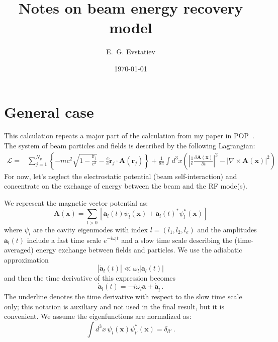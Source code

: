 \documentclass[11pt]{article}
\date{\today} %
\author{E.~G. Evstatiev}
\title{Notes on beam energy recovery model}
\newcommand{\LL}{\mathcal{L}}
\begin{document}
\maketitle

\section{General case}
\label{General_case}

This calculation repeats a major part of the calculation from my paper in POP~\cite{evstatiev_relativistic_2005}. 
The system of beam particles and fields is described by the following Lagrangian:
%
\begin{align}
\LL =& \sum_{j=1}^{N_p}\left\{ -mc^2\sqrt{1-\frac{\dot{\mathbf{r}}_j} {c^2}} 
-\frac{e}{c}\dot{\mathbf{r}}_j \cdot \mathbf{A}(\mathbf{r}_j) \right\}
+\frac{1}{8\pi}\int \!\!d^3 x \left(\left|\frac{1}{c}\frac{\partial \mathbf{A}(\mathbf{x})}{\partial t}\right|^2
 - \left| \nabla\times \mathbf{A}(\mathbf{x}) \right|^2  \right)
\label{L_cont}
\end{align}
%
For now, let's neglect the electrostatic potential (beam self-interaction) and concentrate on the 
exchange of energy between the beam and the RF mode(s).

We represent the magnetic vector potential as:
%
\begin{equation}
\mathbf{A}(\mathbf{x}) = \sum_{l>0}\left[ \mathbf{a}_l(t)\psi_l(\mathbf{x}) + \mathbf{a}_l(t)^*\psi_l^*(\mathbf{x}) 
\right]
\label{A_repr}
\end{equation}
%
where $\psi_l$ are the cavity eigenmodes with index $l=(l_1,l_2,l_e)$ and the amplitudes $\mathbf{a}_l(t)$ include
a fast time scale $e^{-i\omega_l t}$ and a slow time scale describing the (time-averaged) energy exchange between
fields and particles. 
%
We use the adiabatic approximation
%
\begin{equation}
\left| \dot{\mathbf{a}}_l(t)\right| \ll \omega_l \left| \mathbf{a}_l(t)\right|
\label{Adiab_assumpt} 
\end{equation}
%
and then the time derivative of this expression becomes
\begin{equation}
\dot{\mathbf{a}}_l(t) = -i\omega_l \mathbf{a} + \underline{\dot{\mathbf{a}}}_l\, .
\label{Adiab_time_deriv} 
\end{equation}
%
The underline denotes the time derivative with respect to the slow time scale only; this notation is auxiliary
and not used in the final result, but it is convenient.
%
We assume the eigenfunctions are normalized as:
%
\begin{equation}
\int \!\!d^3 x\,  \psi_l(\mathbf{x}) \psi_{l'}^*(\mathbf{x}) = \delta_{l l'}\, .
\label{Eigenfunction_norm} 
\end{equation}
%
\end{document}
